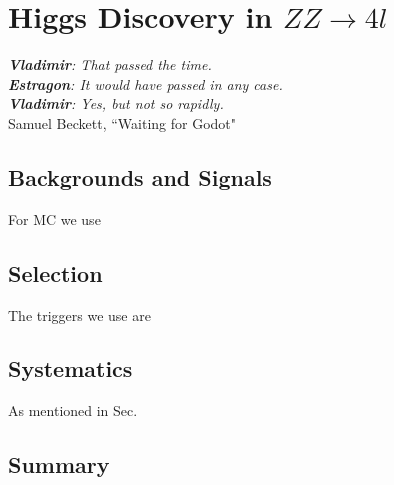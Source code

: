 \chapter{Higgs Discovery in $ZZ\rightarrow4l$}
\label{sec:discovery}

\begin{center}
\begin{footnotesize}
\textit{\textbf{Vladimir}: That passed the time.\\
\textbf{Estragon}: It would have passed in any case.\\
\textbf{Vladimir}: Yes, but not so rapidly.}\\
Samuel Beckett, ``Waiting for Godot"
\end{footnotesize}
\end{center}

\section{Backgrounds and Signals}

For MC we use

\section{Selection}

The triggers we use are

\section{Systematics}

As mentioned in Sec.

\section{Summary}
\label{sec:discovery_summary}